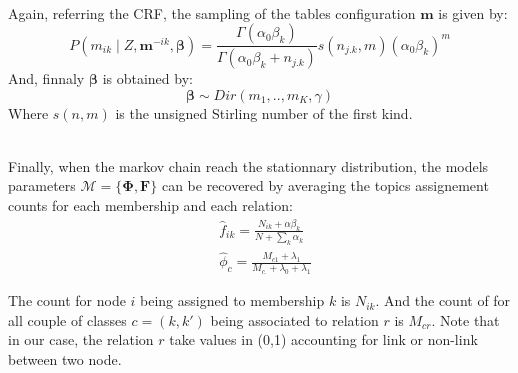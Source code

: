 \documentclass{llncs}
\newcommand{\pr}{P}
\newcommand{\M}{\mathcal{M}}
\newcommand{\mat}[1]{\mathbf{#1}}
\begin{document}
~\\
Again, referring the CRF, the sampling of the tables configuration $\mat{m}$ is given by: 
\begin{equation}
\pr(m_{ik} \mid Z, \bm{m}^{-ik}, \mat{\beta} ) = \frac{\Gamma(\alpha_0 \beta_k)}{\Gamma(\alpha_0 \beta_k + n_{j\bm{.   }k})} s(n_{j\bm{.}k}, m) (\alpha_0 \beta_k)^m
\end{equation}
And, finnaly  $\mat{\beta}$ is obtained by:
\begin{equation}
\mat{\beta} \sim Dir(m_1,.., m_K, \gamma)  
\end{equation}
Where $s(n,m)$ is the unsigned Stirling number of the first kind.


~\\
Finally, when the markov chain reach the stationnary distribution, the models parameters $\M = \{\mat{\Phi}, \mat{F}\}$ can be recovered by averaging the topics assignement counts for each membership and each relation:
\begin{align}
&\hat f_{ik} =\frac{ N_{ik} + \alpha\beta_k}{ N + \sum_k\alpha_k }\\
&\hat \phi_c  = \frac{M_{c1} + \lambda_1}{M_{c\bm{.}} + \lambda_0 + \lambda_1}
\end{align}


The count for node $i$ being assigned to membership $k$ is $N_{ik}$. And the count of for all couple of classes $c=(k,k')$ being associated to relation $r$ is $M_{cr}$. Note that in our case, the relation $r$ take values in (0,1) accounting for link or non-link between two node.
\end{document}
